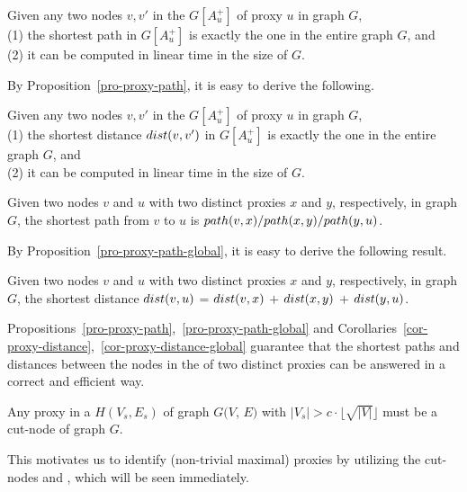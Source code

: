 \begin{prop}
\label{pro-proxy-path} Given any two nodes $v, v'$ in the \dra $G[A^+_u]$ of proxy $u$ in graph $G$, \\
(1) the shortest path in $G[A^+_u]$ is exactly the one in the entire graph $G$, and\\
(2) it can be computed in linear time in the size of $G$.
\end{prop}


By Proposition~\ref{pro-proxy-path}, it is easy to derive the following.

\begin{cor}
\label{cor-proxy-distance} Given any two nodes $v, v'$ in the \dra $G[A^+_u]$ of proxy $u$ in graph $G$, \\
(1) the shortest distance $\dist(v, v')$ in $G[A^+_u]$ is exactly the one in the entire graph $G$, and\\
(2) it can be computed in linear time in the size of $G$.
\end{cor}


\begin{prop}
\label{pro-proxy-path-global} Given two nodes $v$ and $u$ with two distinct proxies $x$ and $y$, respectively, in graph $G$, the shortest path from $v$ to $u$ is $\path(v, x)/\path(x, y)/\path(y, u)$.
\end{prop}



By Proposition~\ref{pro-proxy-path-global}, it is easy to derive the following result.

\begin{cor}
\label{cor-proxy-distance-global} Given two nodes $v$ and $u$ with two distinct proxies $x$ and $y$, respectively, in graph $G$, the shortest distance $\dist(v, u)$ = $\dist(v, x)$ $+$ $\dist(x, y)$  $+$ $\dist(y, u)$.
\end{cor}


Propositions~\ref{pro-proxy-path},~\ref{pro-proxy-path-global} and Corollaries~\ref{cor-proxy-distance},~\ref{cor-proxy-distance-global} guarantee that the shortest paths and distances between the nodes in the \dras of two distinct proxies can be answered in a correct and efficient way.


\begin{prop}
\label{prop-proxy-cut} Any proxy in a \cc $H(V_s, E_s)$ of graph $G(V$, $E)$ with $|V_s|>c\cdot\lfloor\sqrt{|V|}\rfloor$ must be a cut-node of graph $G$.
\end{prop}


This motivates us to identify (non-trivial maximal) proxies by utilizing the cut-nodes and \bccs, which will be seen immediately.


